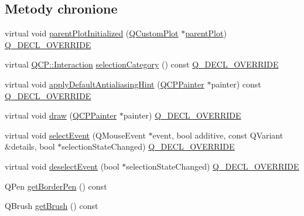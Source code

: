 \subsection*{Metody chronione}
\begin{DoxyCompactItemize}
\item 
virtual void \hyperlink{class_q_c_p_legend_a2b225cefb5eb267771e2c7c44fd2b408}{parent\+Plot\+Initialized} (\hyperlink{class_q_custom_plot}{Q\+Custom\+Plot} $\ast$\hyperlink{class_q_c_p_layerable_ab7e0e94461566093d36ffc0f5312b109}{parent\+Plot}) \hyperlink{qcustomplot_8hh_a42cc5eaeb25b85f8b52d2a4b94c56f55}{Q\+\_\+\+D\+E\+C\+L\+\_\+\+O\+V\+E\+R\+R\+I\+DE}
\item 
virtual \hyperlink{namespace_q_c_p_a2ad6bb6281c7c2d593d4277b44c2b037}{Q\+C\+P\+::\+Interaction} \hyperlink{class_q_c_p_legend_a1a2075e462984f9ff51d9c75bda3581b}{selection\+Category} () const \hyperlink{qcustomplot_8hh_a42cc5eaeb25b85f8b52d2a4b94c56f55}{Q\+\_\+\+D\+E\+C\+L\+\_\+\+O\+V\+E\+R\+R\+I\+DE}
\item 
virtual void \hyperlink{class_q_c_p_legend_a817f75c234f82a2e26643dc0de742095}{apply\+Default\+Antialiasing\+Hint} (\hyperlink{class_q_c_p_painter}{Q\+C\+P\+Painter} $\ast$painter) const \hyperlink{qcustomplot_8hh_a42cc5eaeb25b85f8b52d2a4b94c56f55}{Q\+\_\+\+D\+E\+C\+L\+\_\+\+O\+V\+E\+R\+R\+I\+DE}
\item 
virtual void \hyperlink{class_q_c_p_legend_a74f93358d2b4a76ec95c3a5d825582a3}{draw} (\hyperlink{class_q_c_p_painter}{Q\+C\+P\+Painter} $\ast$painter) \hyperlink{qcustomplot_8hh_a42cc5eaeb25b85f8b52d2a4b94c56f55}{Q\+\_\+\+D\+E\+C\+L\+\_\+\+O\+V\+E\+R\+R\+I\+DE}
\item 
virtual void \hyperlink{class_q_c_p_legend_a71f54a05c3e5b1a1ade1864422cd642e}{select\+Event} (Q\+Mouse\+Event $\ast$event, bool additive, const Q\+Variant \&details, bool $\ast$selection\+State\+Changed) \hyperlink{qcustomplot_8hh_a42cc5eaeb25b85f8b52d2a4b94c56f55}{Q\+\_\+\+D\+E\+C\+L\+\_\+\+O\+V\+E\+R\+R\+I\+DE}
\item 
virtual void \hyperlink{class_q_c_p_legend_ac2066837f7ebc32a5b15434cdca5b176}{deselect\+Event} (bool $\ast$selection\+State\+Changed) \hyperlink{qcustomplot_8hh_a42cc5eaeb25b85f8b52d2a4b94c56f55}{Q\+\_\+\+D\+E\+C\+L\+\_\+\+O\+V\+E\+R\+R\+I\+DE}
\item 
Q\+Pen \hyperlink{class_q_c_p_legend_a60172c9d2212584f38f5d0c1e50970c7}{get\+Border\+Pen} () const 
\item 
Q\+Brush \hyperlink{class_q_c_p_legend_a236fe4cd617c9f88620fd9de74417f20}{get\+Brush} () const 
\end{DoxyCompactItemize}
